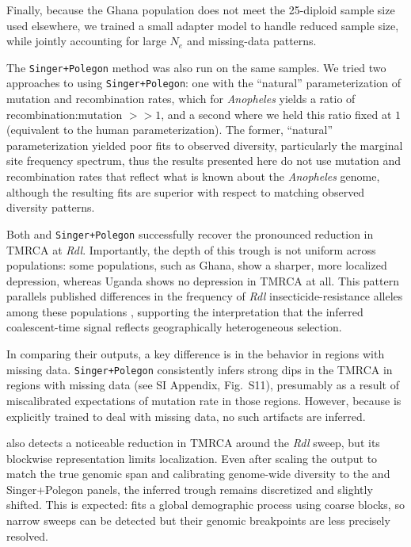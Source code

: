 \documentclass[9pt,twocolumn,twoside]{pnas-new}
\begin{document}
Finally, because the Ghana population does not meet the 25-diploid sample size used elsewhere,
we trained a small adapter model to handle reduced sample size,
while jointly accounting for large $N_e$ and missing-data patterns.


The \texttt{Singer+Polegon} method was also run on the same samples.
We tried two approaches to using \texttt{Singer+Polegon}:
one with the ``natural'' parameterization of mutation and recombination rates,
which for  \textit{Anopheles} yields a ratio of recombination:mutation $>>1$,
and a second where we held this ratio fixed at $1$ (equivalent to the human
parameterization).
The former, ``natural'' parameterization yielded poor fits to observed diversity,
particularly the marginal site frequency spectrum, thus the results presented here
do not use mutation and recombination rates that reflect what is known about the \textit{Anopheles} genome,
although the resulting fits are superior with respect to matching observed diversity patterns.


Both \cxtkit and \texttt{Singer+Polegon} 
successfully recover the pronounced reduction in TMRCA at \emph{Rdl}.
Importantly, the depth of this trough is not uniform across populations:
some populations, such as Ghana, show a sharper, more localized depression,
whereas Uganda shows no depression in TMRCA at all. 
This pattern parallels published differences in the frequency of \emph{Rdl}
insecticide-resistance alleles among these populations
\cite{grau2020evolution},
supporting the interpretation that the inferred coalescent-time signal reflects
geographically heterogeneous selection.

In comparing their outputs, a key difference is in the behavior in regions 
with missing data. \texttt{Singer+Polegon} consistently infers strong dips
in the TMRCA in regions with missing data (see SI Appendix, Fig.~S11),
presumably as a result of miscalibrated expectations of mutation rate in those regions. 
However, because \cxtkit is explicitly trained to deal with missing data, no such
artifacts are inferred. 


\smcpp also detects a noticeable reduction in TMRCA around the \emph{Rdl} sweep,
but its blockwise representation limits localization.
Even after scaling the output to match the true genomic span and calibrating
genome-wide diversity to the \cxtkit and Singer+Polegon panels,
the inferred trough remains discretized and slightly shifted.
This is expected: \smcpp fits a global demographic process using coarse blocks,
so narrow sweeps can be detected but their genomic breakpoints are less precisely resolved.
\end{document}
